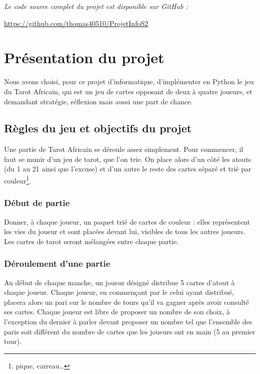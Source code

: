 \noindent\textit{Le code source complet du projet est disponible sur GitHub :}

\begin{center}
   {\color{blue}\url{https://github.com/thomas40510/ProjetInfoS2}}
\end{center}

\hrulefill


\section{Présentation du projet}\label{sec:présentation-du-projet}
   Nous avons choisi, pour ce projet d'informatique, d'implémenter en Python le jeu du Tarot Africain, qui est un jeu de cartes opposant de deux à quatre joueurs, et demandant stratégie, réflexion mais aussi une part de chance.

   \subsection{Règles du jeu et objectifs du projet}\label{subsec:règles-du-jeu-et-objectifs-du-projet}
      Une partie de Tarot Africain se déroule assez simplement.
      Pour commencer, il faut se munir d'un jeu de tarot, que l'on trie.
      On place alors d'un côté les atouts (du 1 au 21 ainsi que l'excuse) et d'un autre le reste des cartes séparé et trié par couleur\footnote{pique, carreau\dots}.
      \subsubsection{Début de partie}
         Donner, à chaque joueur, un paquet trié de cartes de couleur : elles représentent les vies du joueur et sont placées devant lui, visibles de tous les autres joueurs.
         Les cartes de tarot seront mélangées entre chaque partie.
      \subsubsection{Déroulement d'une partie}
         Au début de chaque manche, un joueur désigné distribue 5 cartes d'atout à chaque joueur.
         Chaque joueur, en commençant par le celui ayant distribué, placera alors un pari sur le nombre de tours qu'il va gagner après avoir consulté ses cartes.
         Chaque joueur est libre de proposer un nombre de son choix, à l'exception du dernier à parler devant proposer un nombre tel que l'ensemble des paris soit différent du nombre de cartes que les joueurs ont en main (5 au premier tour).

